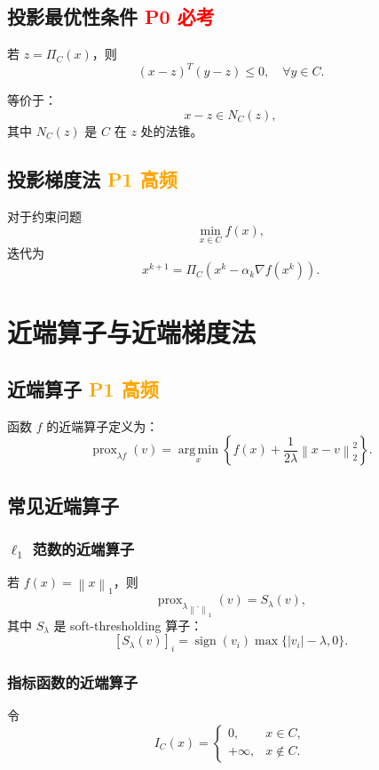 \documentclass[11pt,a4paper]{ctexart}
\newcommand{\prox}{\operatorname{prox}}
\newcommand{\argmin}{\operatorname*{arg\,min}}
\newcommand{\norm}[1]{\left\lVert #1 \right\rVert}
\newcommand{\Pzero}{\textcolor{red}{\textbf{P0 必考}}}
\newcommand{\Pone}{\textcolor{orange}{\textbf{P1 高频}}}
\theoremstyle{definition}
\theoremstyle{plain}
\theoremstyle{remark}
\begin{document}
\subsection{投影最优性条件 \Pzero}

若 $z=\Pi_C(x)$，则
\[
    (x-z)^T(y-z)\le 0,\quad \forall y\in C.
\]

等价于：
\[
    x-z \in N_C(z),
\]
其中 $N_C(z)$ 是 $C$ 在 $z$ 处的法锥。

\subsection{投影梯度法 \Pone}

对于约束问题
\[
    \min_{x\in C} f(x),
\]
迭代为
\[
    x^{k+1}
    =
    \Pi_C\left(x^k-\alpha_k\nabla f(x^k)\right).
\]

\section{近端算子与近端梯度法}

\subsection{近端算子 \Pone}

函数 $f$ 的近端算子定义为：
\[
    \prox_{\lambda f}(v)
    =
    \argmin_x
    \left\{
    f(x)+\frac{1}{2\lambda}\norm{x-v}_2^2
    \right\}.
\]

\subsection{常见近端算子}

\subsubsection*{$\ell_1$ 范数的近端算子}

若 $f(x)=\norm{x}_1$，则
\[
    \prox_{\lambda \norm{\cdot}_1}(v)
    =
    S_\lambda(v),
\]
其中 $S_\lambda$ 是 soft-thresholding 算子：
\[
    [S_\lambda(v)]_i
    =
    \operatorname{sign}(v_i)\max\{|v_i|-\lambda,0\}.
\]

\subsubsection*{指标函数的近端算子}

令
\[
    I_C(x)=
    \begin{cases}
    0, & x\in C,\\
    +\infty, & x\notin C.
    \end{cases}
\]
\end{document}
